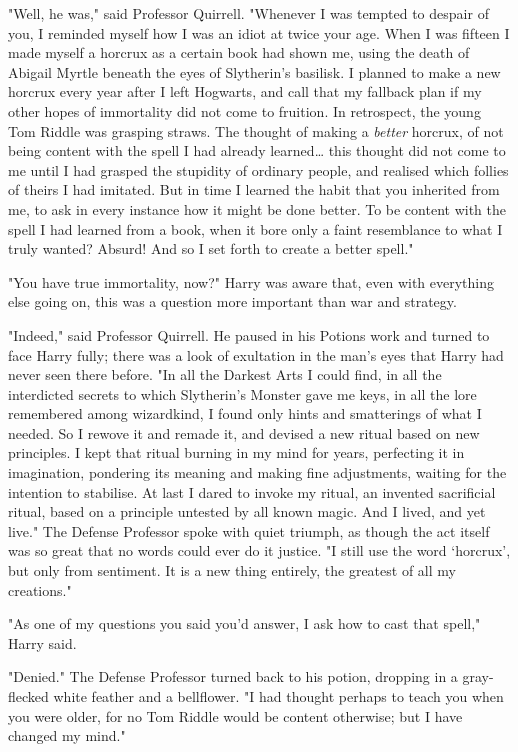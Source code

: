 "Well, he was," said Professor Quirrell. "Whenever I was tempted to despair of
you, I reminded myself how I was an idiot at twice your age. When I was fifteen
I made myself a horcrux as a certain book had shown me, using the death of
Abigail Myrtle beneath the eyes of Slytherin's basilisk. I planned to make a
new horcrux every year after I left Hogwarts, and call that my fallback plan if
my other hopes of immortality did not come to fruition. In retrospect, the
young Tom Riddle was grasping straws. The thought of making a \emph{better}
horcrux, of not being content with the spell I had already learned{\ldots} this
thought did not come to me until I had grasped the stupidity of ordinary
people, and realised which follies of theirs I had imitated. But in time I
learned the habit that you inherited from me, to ask in every instance how it
might be done better. To be content with the spell I had learned from a book,
when it bore only a faint resemblance to what I truly wanted? Absurd! And so I
set forth to create a better spell."

"You have true immortality, now?" Harry was aware that, even with everything
else going on, this was a question more important than war and strategy.

"Indeed," said Professor Quirrell. He paused in his Potions work and turned to
face Harry fully; there was a look of exultation in the man's eyes that Harry
had never seen there before. "In all the Darkest Arts I could find, in all the
interdicted secrets to which Slytherin's Monster gave me keys, in all the lore
remembered among wizardkind, I found only hints and smatterings of what I
needed. So I rewove it and remade it, and devised a new ritual based on new
principles. I kept that ritual burning in my mind for years, perfecting it in
imagination, pondering its meaning and making fine adjustments, waiting for the
intention to stabilise. At last I dared to invoke my ritual, an invented
sacrificial ritual, based on a principle untested by all known magic. And I
lived, and yet live." The Defense Professor spoke with quiet triumph, as though
the act itself was so great that no words could ever do it justice. "I still
use the word `horcrux', but only from sentiment. It is a new thing entirely,
the greatest of all my creations."

"As one of my questions you said you'd answer, I ask how to cast that spell,"
Harry said.

"Denied." The Defense Professor turned back to his potion, dropping in a
gray-flecked white feather and a bellflower. "I had thought perhaps to teach
you when you were older, for no Tom Riddle would be content otherwise; but I
have changed my mind."

